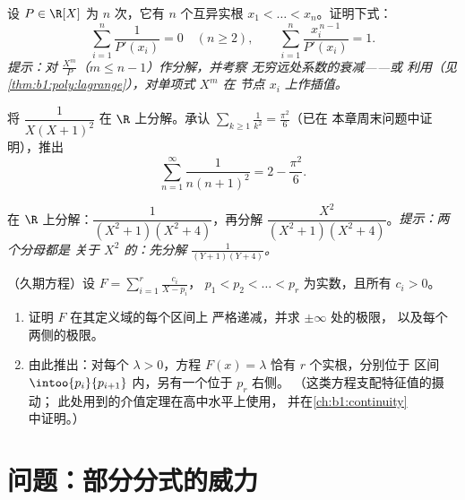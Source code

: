 \begin{exercise}[$\star\star\star$]\label{exo:b1:fractions:9}
设 $P \in \R[X]$ 为 $n$ 次，它有 $n$ 个互异实根
$x_1 < \dots < x_n$。证明下式：
\[
\sum_{i=1}^{n} \frac{1}{P'(x_i)} = 0 \quad (n \geq 2),
\qquad
\sum_{i=1}^{n} \frac{x_i^{\,n-1}}{P'(x_i)} = 1 .
\]
\emph{提示：对 $\frac{X^m}{P}$（$m \leq n - 1$）作分解，并考察
无穷远处系数的衰减——或
利用（见\cref{thm:b1:poly:lagrange}），对单项式 $X^m$ 在
节点 $x_i$ 上作插值。}
\end{exercise}

\begin{exercise}[$\star\star$]\label{exo:b1:fractions:10}
将 $\dfrac{1}{X(X+1)^2}$ 在 $\R$ 上分解。承认
$\sum_{k \geq 1} \frac1{k^2} = \frac{\pi^2}6$（已在
本章周末问题中证明），推出
\[
\sum_{n=1}^{\infty} \frac{1}{n(n+1)^2} = 2 - \frac{\pi^2}{6} .
\]
\end{exercise}

\begin{exercise}[$\star\star$]\label{exo:b1:fractions:11}
在 $\R$ 上分解：$\dfrac{1}{(X^2+1)(X^2+4)}$，再分解
$\dfrac{X^2}{(X^2+1)(X^2+4)}$。\emph{提示：两个分母都是
关于 $X^2$ 的：先分解 $\frac1{(Y+1)(Y+4)}$。}
\end{exercise}

\begin{exercise}[$\star\star\star$]\label{exo:b1:fractions:12}
（久期方程）设 $F = \sum_{i=1}^{r} \frac{c_i}{X - p_i}$，
$p_1 < p_2 < \dots < p_r$ 为实数，且所有 $c_i > 0$。
\begin{enumerate}
  \item 证明 $F$ 在其定义域的每个区间上
        严格递减，并求 $\pm\infty$ 处的极限，
        以及每个两侧的极限。
  \item 由此推出：对每个 $\lambda > 0$，方程 $F(x) =
        \lambda$ 恰有 $r$ 个实根，分别位于
        区间 $\intoo{p_i}{p_{i+1}}$ 内，另有一个位于 $p_r$ 右侧。
        （这类方程支配特征值的摄动；
        此处用到的介值定理在高中水平上使用，
        并在\cref{ch:b1:continuity}中证明。）
\end{enumerate}
\end{exercise}

\section{问题：部分分式的威力}

